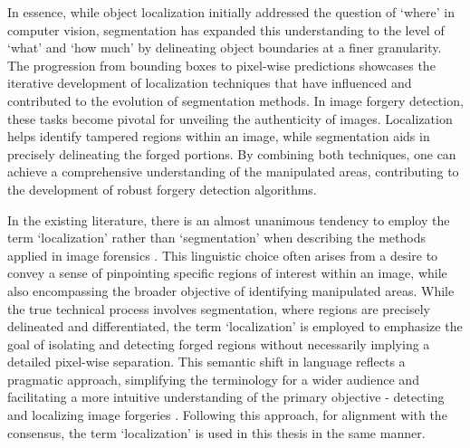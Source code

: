 In essence, while object localization initially addressed the question of `where' in computer vision, segmentation has expanded this understanding to the level of `what' and `how much' by delineating object boundaries at a finer granularity. The progression from bounding boxes to pixel-wise predictions showcases the iterative development of localization techniques that have influenced and contributed to the evolution of segmentation methods. In image forgery detection, these tasks become pivotal for unveiling the authenticity of images. Localization helps identify tampered regions within an image, while segmentation aids in precisely delineating the forged portions. By combining both techniques, one can achieve a comprehensive understanding of the manipulated areas, contributing to the development of robust forgery detection algorithms.

In the existing literature, there is an almost unanimous tendency to employ the term `localization' rather than `segmentation' when describing the methods applied in image forensics \cite{guo2023hierarchical} \cite{lai2023detect} \cite{Sharma2019} \cite{bunk2017detection} \cite{wang2019detection} \cite{Cozzolino2016} \cite{bianchi2011improved}. This linguistic choice often arises from a desire to convey a sense of pinpointing specific regions of interest within an image, while also encompassing the broader objective of identifying manipulated areas. While the true technical process involves segmentation, where regions are precisely delineated and differentiated, the term `localization' is employed to emphasize the goal of isolating and detecting forged regions without necessarily implying a detailed pixel-wise separation. This semantic shift in language reflects a pragmatic approach, simplifying the terminology for a wider audience and facilitating a more intuitive understanding of the primary objective - detecting and localizing image forgeries \cite{coulson2001semantic}. Following this approach, for alignment with the consensus, the term `localization' is used in this thesis in the same manner. 